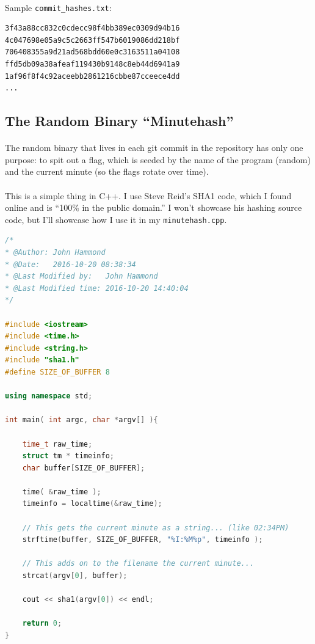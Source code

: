 \documentclass[11pt]{article}
\begin{document}
\paragraph{} Sample \texttt{commit\_hashes.txt}:

	\begin{lstlisting}[language=bash]
3f43a88cc832c0cdecc98f4bb389ec0309d94b16
4c047698e05a9c5c2663ff547b6019086dd218bf
706408355a9d21ad568bdd60e0c3163511a04108
ffd5db09a38afeaf119430b9148c8eb44d6941a9
1af96f8f4c92aceebb2861216cbbe87cceece4dd
...
\end{lstlisting}

	\newpage

	\subsection{The Random Binary ``Minutehash''}

	\paragraph{} The random binary that lives in each git commit in the repository has only one purpose: to spit out a flag, which is seeded by the name of the program (random) and the current minute (so the flags rotate over time).

	\paragraph{} This is a simple thing in C++. I use Steve Reid's SHA1 code, which I found online and is ``100\% in the public domain.'' I won't showcase his hashing source code, but I'll showcase how I use it in my \texttt{minutehash.cpp}.\\



		\begin{lstlisting}[language=c++]
/*
* @Author: John Hammond
* @Date:   2016-10-20 08:38:34
* @Last Modified by:   John Hammond
* @Last Modified time: 2016-10-20 14:40:04
*/

#include <iostream>
#include <time.h>
#include <string.h>
#include "sha1.h"
#define SIZE_OF_BUFFER 8

using namespace std;

int main( int argc, char *argv[] ){

	time_t raw_time;
	struct tm * timeinfo;
	char buffer[SIZE_OF_BUFFER];

	time( &raw_time );
	timeinfo = localtime(&raw_time);

	// This gets the current minute as a string... (like 02:34PM)
	strftime(buffer, SIZE_OF_BUFFER, "%I:%M%p", timeinfo );

	// This adds on to the filename the current minute...
	strcat(argv[0], buffer);

	cout << sha1(argv[0]) << endl;

	return 0;
}
\end{lstlisting}
\end{document}
